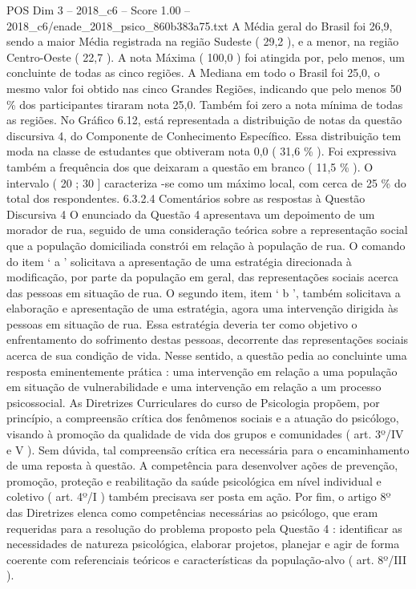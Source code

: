 \begin{textsample}{POS Dim 3 – 2018\_c6 – Score 1.00 – 2018\_c6/enade\_2018\_psico\_860b383a75.txt}
A Média geral do Brasil foi 26,9, sendo a maior Média registrada na região Sudeste ( 29,2 ), e a menor, na região Centro-Oeste ( 22,7 ).
A nota Máxima ( 100,0 ) foi atingida por, pelo menos, um concluinte de todas as cinco regiões.
A Mediana em todo o Brasil foi 25,0, o mesmo valor foi obtido nas cinco Grandes Regiões, indicando que pelo menos 50 \% dos participantes tiraram nota 25,0.
Também foi zero a nota mínima de todas as regiões.
No Gráfico 6.12, está representada a distribuição de notas da questão discursiva 4, do Componente de Conhecimento Específico.
Essa distribuição tem moda na classe de estudantes que obtiveram nota 0,0 ( 31,6 \% ).
Foi expressiva também a frequência dos que deixaram a questão em branco ( 11,5 \% ).
O intervalo ( 20 ; 30 ] caracteriza -se como um máximo local, com cerca de 25 \% do total dos respondentes. 6.3.2.4 Comentários sobre as respostas à Questão Discursiva 4 O enunciado da Questão 4 apresentava um depoimento de um morador de rua, seguido de uma consideração teórica sobre a representação social que a população domiciliada constrói em relação à população de rua.
O comando do item ‘ a ’ solicitava a apresentação de uma estratégia direcionada à modificação, por parte da população em geral, das representações sociais acerca das pessoas em situação de rua.
O segundo item, item ‘ b ’, também solicitava a elaboração e apresentação de uma estratégia, agora uma intervenção dirigida às pessoas em situação de rua.
Essa estratégia deveria ter como objetivo o enfrentamento do sofrimento destas pessoas, decorrente das representações sociais acerca de sua condição de vida.
Nesse sentido, a questão pedia ao concluinte uma resposta eminentemente prática : uma intervenção em relação a uma população em situação de vulnerabilidade e uma intervenção em relação a um processo psicossocial.
As Diretrizes Curriculares do curso de Psicologia propõem, por princípio, a compreensão crítica dos fenômenos sociais e a atuação do psicólogo, visando à promoção da qualidade de vida dos grupos e comunidades ( art. 3º/IV e V ).
Sem dúvida, tal compreensão crítica era necessária para o encaminhamento de uma reposta à questão.
A competência para desenvolver ações de prevenção, promoção, proteção e reabilitação da saúde psicológica em nível individual e coletivo ( art. 4º/I ) também precisava ser posta em ação.
Por fim, o artigo 8º das Diretrizes elenca como competências necessárias ao psicólogo, que eram requeridas para a resolução do problema proposto pela Questão 4 : identificar as necessidades de natureza psicológica, elaborar projetos, planejar e agir de forma coerente com referenciais teóricos e características da população-alvo ( art. 8º/III ).

\end{textsample}
